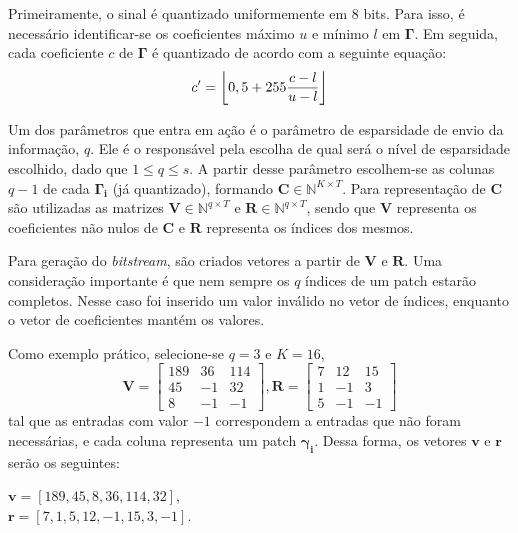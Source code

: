 \documentclass[cic,tc]{iiufrgs}
\renewcommand{\vec}[1]{\bm{#1}}
\newcommand{\mat}[1]{\bm{#1}}
\DeclarePairedDelimiter{\floor}{\lfloor}{\rfloor}
\begin{document}
Primeiramente, o sinal é quantizado uniformemente em 8 bits. 
Para isso, é necessário identificar-se os coeficientes máximo $u$ e mínimo $l$ em $\mat{\Gamma}$.
Em seguida, cada coeficiente $c$ de $\mat{\Gamma}$ é quantizado de acordo com a seguinte equação:
\begin{equation*}
    c' = \floor*{0,5 + 255\frac{c - l}{u - l}}
\end{equation*}

Um dos parâmetros que entra em ação é o parâmetro de esparsidade de envio da informação, $q$. 
Ele é o responsável pela escolha de qual será o nível de esparsidade escolhido,
dado que $1 \le q \le s$.
A partir desse parâmetro escolhem-se as colunas $q-1$ de cada $\mat{\Gamma_i}$ (já quantizado), 
formando $\mat{C} \in \mathbb{N}^{K \times T}$.
Para representação de $\mat{C}$ são utilizadas as matrizes $\mat{V} \in \mathbb{N}^{q \times T}$ e
$\mat{R} \in \mathbb{N}^{q \times T}$, sendo que $\mat{V}$ representa os coeficientes não nulos de
$\mat{C}$ e $\mat{R}$ representa os índices dos mesmos.

Para geração do \textit{bitstream}, são criados vetores a partir de $\mat{V}$ e $\mat{R}$.
Uma consideração importante é que nem sempre os $q$ índices de um patch estarão completos.
Nesse caso foi inserido um valor inválido no vetor de índices, enquanto o vetor de coeficientes
mantém os valores.

Como exemplo prático, selecione-se $q=3$ e $K=16$,
\begin{equation*}
    \mat{V} = 
    \begin{bmatrix}
        189 & 36 & 114 \\
        45  & -1 & 32  \\
        8   & -1 & -1
    \end{bmatrix},
    \mat{R} = 
    \begin{bmatrix}
        7 & 12 & 15 \\
        1  & -1 & 3  \\
        5   & -1 & -1
    \end{bmatrix}
\end{equation*}
tal que as entradas com valor $-1$ correspondem a entradas que não foram necessárias, 
e cada coluna representa um patch $\vec{\gamma_i}$. 
Dessa forma, os vetores $\vec{v}$ e $\vec{r}$ serão os seguintes: 
\begin{center}
    $\vec{v} = \left[ 189, 45, 8, 36, 114, 32 \right]$, \\
    $\vec{r} = \left[ 7,1,5,12,-1,15,3,-1 \right]$.
\end{center}
\end{document}
